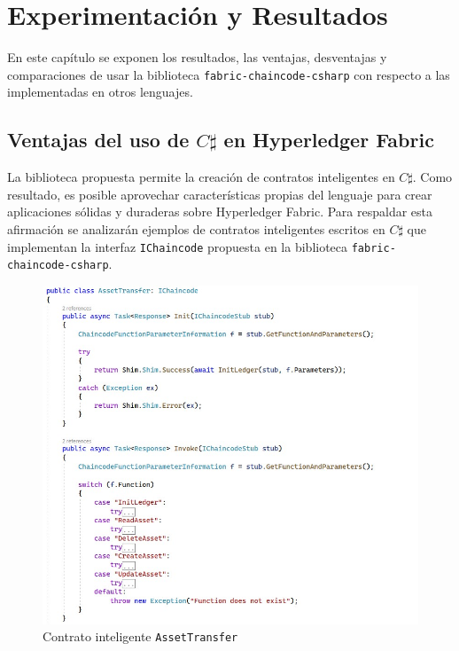\chapter{Experimentación y Resultados}\label{chapter:implementation}
En este capítulo se exponen los resultados, las ventajas, desventajas y comparaciones de usar la biblioteca \texttt{fabric-chaincode-csharp} con respecto a las implementadas en otros lenguajes.

\section{Ventajas del uso de $ C\sharp $ en Hyperledger Fabric}
La biblioteca propuesta permite la creación de contratos inteligentes en  $ C\sharp $. Como resultado, es posible aprovechar características propias del lenguaje para crear aplicaciones sólidas y duraderas sobre Hyperledger Fabric. Para respaldar esta afirmación se analizarán ejemplos de contratos inteligentes escritos en $ C\sharp $ que implementan la interfaz \texttt{IChaincode} propuesta en la biblioteca \texttt{fabric-chaincode-csharp}.



\begin{figure}[tbph]
\centering
\includegraphics[width=\textwidth]{Images/assettransfer}
\caption{Contrato inteligente \texttt{AssetTransfer}}
\label{fig:assettransfer}
\end{figure}


